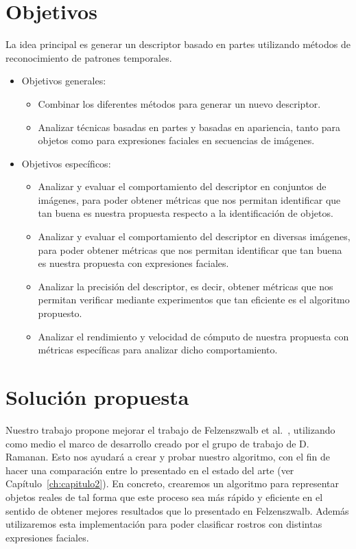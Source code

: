 \section{Objetivos}
La idea principal es generar un descriptor basado en partes utilizando métodos de reconocimiento de patrones temporales.
\begin{itemize}
		\item Objetivos generales:
			\begin{itemize}
				\item Combinar los diferentes métodos para generar un nuevo descriptor.
				\item Analizar técnicas basadas en partes y basadas en apariencia, tanto para objetos como para expresiones faciales en secuencias de imágenes.
			\end{itemize}
		\item Objetivos específicos:
			\begin{itemize}
				\item Analizar y evaluar el comportamiento del descriptor en conjuntos de imágenes, para poder obtener métricas que nos permitan identificar que tan buena es nuestra propuesta respecto a la identificación de objetos.
				\item Analizar y evaluar el comportamiento del descriptor en diversas imágenes, para poder obtener métricas que nos permitan identificar que tan buena es nuestra propuesta con expresiones faciales.
				\item Analizar la precisión del descriptor, es decir, obtener métricas que nos permitan verificar mediante experimentos que tan eficiente es el algoritmo propuesto.
				\item Analizar el rendimiento y velocidad de cómputo de nuestra propuesta con métricas específicas para analizar dicho comportamiento.
				
			\end{itemize}			

	\end{itemize}

\section{Solución propuesta}

Nuestro trabajo propone mejorar el trabajo de Felzenszwalb et al.~\cite{Felzenszwalb2008,Felzenszwalb2010,Felzenszwalb2013}, utilizando como medio el marco de desarrollo creado por el grupo de trabajo de D. Ramanan. Esto nos ayudará a crear y probar nuestro algoritmo, con el fin de hacer una comparación entre lo presentado en el estado del arte (ver Capítulo~\ref{ch:capitulo2}). En concreto, crearemos un algoritmo para representar objetos reales de tal forma que este proceso sea más rápido y eficiente en el sentido de obtener mejores resultados que lo presentado en Felzenszwalb. Además utilizaremos esta implementación para poder clasificar rostros con distintas expresiones faciales.

